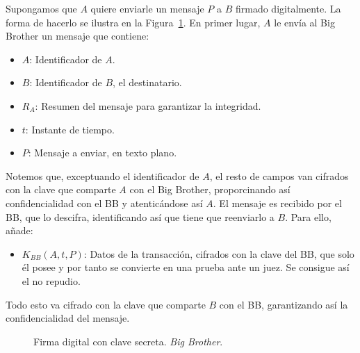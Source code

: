 Supongamos que $A$ quiere enviarle un mensaje $P$ a $B$ firmado digitalmente. La forma de hacerlo se ilustra en la Figura~\ref{fig:big-brother}. En primer lugar, $A$ le envía al Big Brother un mensaje que contiene:
\begin{itemize}
    \item {$A$}: Identificador de $A$.
    \item {$B$}: Identificador de $B$, el destinatario.
    \item {$R_A$}: Resumen del mensaje para garantizar la integridad.
    \item {$t$}: Instante de tiempo.
    \item {$P$}: Mensaje a enviar, en texto plano.
\end{itemize}
Notemos que, exceptuando el identificador de $A$, el resto de campos van cifrados con la clave que comparte $A$ con el Big Brother, proporcinando así confidencialidad con el BB y atenticándose así $A$. El mensaje es recibido por el BB, que lo descifra, identificando así que tiene que reenviarlo a $B$. Para ello, añade:
\begin{itemize}
    \item {$K_{BB}(A,t,P)$}: Datos de la transacción, cifrados con la clave del BB, que solo él posee y por tanto se convierte en una prueba ante un juez. Se consigue así el no repudio.
\end{itemize}
Todo esto va cifrado con la clave que comparte $B$ con el BB, garantizando así la confidencialidad del mensaje.
\begin{figure}
    \centering
    \caption{Firma digital con clave secreta. \emph{Big Brother}.}
    \label{fig:big-brother}
\end{figure}


